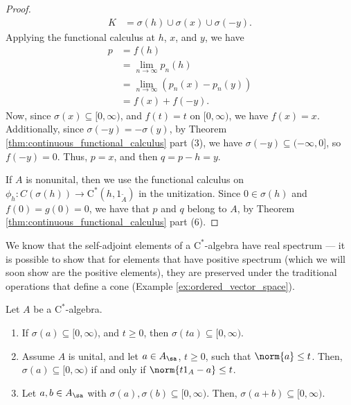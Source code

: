 \begin{proof}
  \begin{align*}
    K &= \sigma\left( h \right)\cup \sigma\left( x \right)\cup \sigma\left( -y \right).
  \end{align*}
  Applying the functional calculus at $h$, $x$, and $y$, we have
  \begin{align*}
    p &= f(h)\\
      &= \lim_{n\rightarrow\infty}p_n(h)\\
      &= \lim_{n\rightarrow\infty} \left( p_n\left( x \right)-p_n\left( y \right) \right)\\
      &= f(x) + f(-y).
  \end{align*}
  Now, since $\sigma\left( x \right)\subseteq [0,\infty)$, and $f(t) = t$ on $[0,\infty)$, we have $f(x) = x$. Additionally, since $\sigma\left( -y \right) = -\sigma\left( y \right)$, by Theorem \ref{thm:continuous_functional_calculus} part (3), we have $\sigma\left( -y \right)\subseteq (-\infty,0]$, so $f\left( -y \right) = 0$. Thus, $p = x$, and then $q = p-h = y$.\newline

  If $A$ is nonunital, then we use the functional calculus on $\phi_h\colon C\left( \sigma\left( h \right) \right)\rightarrow \mathrm{C}^{\ast}\left( h,1_{\widetilde{A}} \right)$ in the unitization. Since $0\in \sigma\left( h \right)$ and $f(0) = g(0) = 0$, we have that $p$ and $q$ belong to $A$, by Theorem \ref{thm:continuous_functional_calculus} part (6).
\end{proof}
We know that the self-adjoint elements of a $\mathrm{C}^{\ast}$-algebra have real spectrum --- it is possible to show that for elements that have positive spectrum (which we will soon show are the positive elements), they are preserved under the traditional operations that define a cone (Example \ref{ex:ordered_vector_space}).
\begin{lemma}\label{lemma:spectrum_conic_operations}
  Let $A$ be a $\mathrm{C}^{\ast}$-algebra.
  \begin{enumerate}[(1)]
    \item If $\sigma\left( a \right)\subseteq [0,\infty)$, and $t\geq 0$, then $\sigma\left( ta \right)\subseteq [0,\infty)$.
    \item Assume $A$ is unital, and let $a\in A_{\sa}$, $t \geq 0$, such that $\norm{a}\leq t$. Then, $\sigma\left( a \right)\subseteq [0,\infty)$ if and only if $\norm{t1_A - a} \leq t$.
    \item Let $a,b\in A_{\sa}$ with $\sigma\left( a \right),\sigma\left( b \right)\subseteq [0,\infty)$. Then, $\sigma\left( a+b \right)\subseteq [0,\infty)$.
  \end{enumerate}
\end{lemma}
